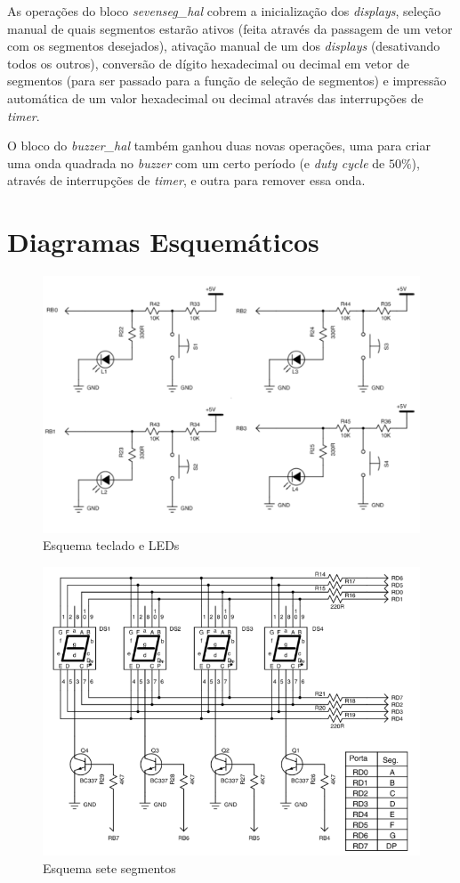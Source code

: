 \documentclass{article}
\begin{document}
As operações do bloco \textit{sevenseg\_hal} cobrem a inicialização dos \textit{displays}, seleção manual de quais segmentos estarão ativos (feita através da passagem de um vetor com os segmentos desejados), ativação manual de um dos \textit{displays} (desativando todos os outros), conversão de dígito hexadecimal ou decimal em vetor de segmentos (para ser passado para a função de seleção de segmentos) e impressão automática de um valor hexadecimal ou decimal através das interrupções de \textit{timer}.

O bloco do \textit{buzzer\_hal} também ganhou duas novas operações, uma para criar uma onda quadrada no \textit{buzzer} com um certo período (e \textit{duty cycle} de $50\%$), através de interrupções de \textit{timer}, e outra para remover essa onda.

\section{Diagramas Esquemáticos}

\begin{figure}[H]
	\centering
	\includegraphics[width=0.7\linewidth]{esq_ledswi}
	\caption{Esquema teclado e LEDs}
	\label{fig:esq_ledswi}
\end{figure}
\begin{figure}[H]
	\centering
	\includegraphics[width=0.9\linewidth]{esq_7seg}
	\caption{Esquema sete segmentos}
	\label{fig:esq_7seg}
\end{figure}
\end{document}
